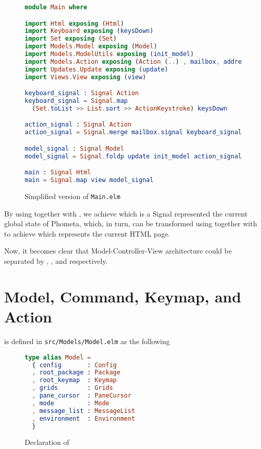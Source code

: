 \documentclass[master.tex]{subfiles}
\begin{document}
\begin{figure}[H]
\begin{framed}
\begin{lstlisting}[language=elm]
module Main where

import Html exposing (Html)
import Keyboard exposing (keysDown)
import Set exposing (Set)
import Models.Model exposing (Model)
import Models.ModelUtils exposing (init_model)
import Models.Action exposing (Action (..) , mailbox, address)
import Updates.Update exposing (update)
import Views.View exposing (view)

keyboard_signal : Signal Action
keyboard_signal = Signal.map
  (Set.toList >> List.sort >> ActionKeystroke) keysDown

action_signal : Signal Action
action_signal = Signal.merge mailbox.signal keyboard_signal

model_signal : Signal Model
model_signal = Signal.foldp update init_model action_signal

main : Signal Html
main = Signal.map view model_signal
\end{lstlisting}
\end{framed}
\caption{Simplified version of \texttt{Main.elm}}
\label{fig:implementation-simplified-main}
\end{figure}

By using  together with , we achieve  which is a Signal represented the
current global state of Phometa, which, in turn, can be transformed using
 together with  to achieve
 which represents the current HTML page.

Now, it becomes clear that Model-Controller-View architecture could be separated
by , , and  respectively.

\newpage

\section{Model, Command, Keymap, and Action}
 is defined in \texttt{src/Models/Model.elm} as the following

\begin{figure}[H]
\begin{framed}
\begin{lstlisting}[language=elm]
type alias Model =
  { config       : Config
  , root_package : Package
  , root_keymap  : Keymap
  , grids        : Grids
  , pane_cursor  : PaneCursor
  , mode         : Mode
  , message_list : MessageList
  , environment  : Environment
  }
\end{lstlisting}
\end{framed}
\caption{Declaration of }
\label{fig:implementation-model}
\end{figure}
\end{document}
